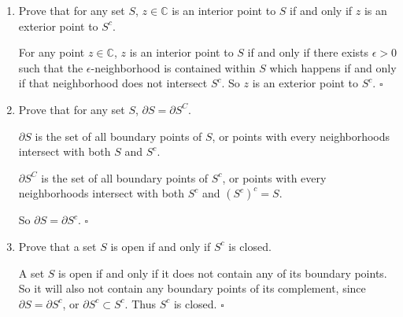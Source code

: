 \documentclass[12pt]{article}
\begin{document}
\begin{enumerate}
    \item Prove that for any set $S$, $z \in \mathbb{C}$ is an interior point to $S$ if and only if $z$ is an exterior point to $S^c$.

    For any point $z \in \mathbb{C}$, $z$ is an interior point to $S$ if and only if there exists $\epsilon > 0$ such that the $\epsilon$-neighborhood is contained within $S$ which happens if and only if that neighborhood does not intersect $S^c$. So $z$ is an exterior point to $S^c$. $\square$
    \item Prove that for any set $S$, $\partial S = \partial S^C$.

    $\partial S$ is the set of all boundary points of $S$, or points with every neighborhoods intersect with both $S$ and $S^c$. 
    
    $\partial S^C$ is the set of all boundary points of $S^c$, or points with every neighborhoods intersect with both $S^c$ and $(S^c)^c = S$.

    So $\partial S = \partial S^c$. $\square$
    \item Prove that a set $S$ is open if and only if $S^c$ is closed.

    A set $S$ is open if and only if it does not contain any of its boundary points. So it will also not contain any boundary points of its complement, since $\partial S = \partial S^c$, or $\partial S^c \subset S^c$. Thus $S^c$ is closed. $\square$
    
\end{enumerate}
\end{document}
